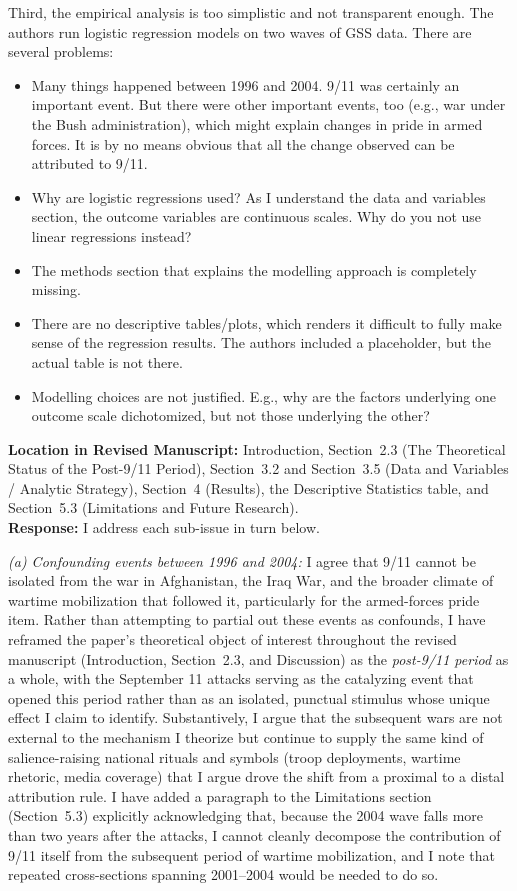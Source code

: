 \documentclass[11pt]{article}
\begin{document}
\begin{reviewercomment}
Third, the empirical analysis is too simplistic and not transparent enough. The authors run logistic regression models on two waves of GSS data. There are several problems: 
\begin{itemize}
\item Many things happened between 1996 and 2004. 9/11 was certainly an important event. But there were other important events, too (e.g., war under the Bush administration), which might explain changes in pride in armed forces. It is by no means obvious that all the change observed can be attributed to 9/11.
\item Why are logistic regressions used? As I understand the data and variables section, the outcome variables are continuous scales. Why do you not use linear regressions instead?
\item The methods section that explains the modelling approach is completely missing.
\item There are no descriptive tables/plots, which renders it difficult to fully make sense of the regression results. The authors included a placeholder, but the actual table is not there.
\item Modelling choices are not justified. E.g., why are the factors underlying one outcome scale dichotomized, but not those underlying the other?
\end{itemize}
\end{reviewercomment}

\noindent\textbf{Location in Revised Manuscript:} Introduction, Section~2.3 (The Theoretical Status of the Post-9/11 Period), Section~3.2 and Section~3.5 (Data and Variables / Analytic Strategy), Section~4 (Results), the Descriptive Statistics table, and Section~5.3 (Limitations and Future Research).\\[4pt]
\textbf{Response:} I address each sub-issue in turn below.

\textit{(a) Confounding events between 1996 and 2004:} I agree that 9/11 cannot be isolated from the war in Afghanistan, the Iraq War, and the broader climate of wartime mobilization that followed it, particularly for the armed-forces pride item. Rather than attempting to partial out these events as confounds, I have reframed the paper's theoretical object of interest throughout the revised manuscript (Introduction, Section~2.3, and Discussion) as the \textit{post-9/11 period} as a whole, with the September 11 attacks serving as the catalyzing event that opened this period rather than as an isolated, punctual stimulus whose unique effect I claim to identify. Substantively, I argue that the subsequent wars are not external to the mechanism I theorize but continue to supply the same kind of salience-raising national rituals and symbols (troop deployments, wartime rhetoric, media coverage) that I argue drove the shift from a proximal to a distal attribution rule. I have added a paragraph to the Limitations section (Section~5.3) explicitly acknowledging that, because the 2004 wave falls more than two years after the attacks, I cannot cleanly decompose the contribution of 9/11 itself from the subsequent period of wartime mobilization, and I note that repeated cross-sections spanning 2001--2004 would be needed to do so.
\end{document}
